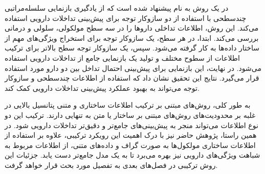 در \cite{ref_dai2020} یک روش به نام  پیشنهاد شده است که از یادگیری بازنمایی سلسله‌مراتبی چندسطحی با استفاده از دو سازوکار توجه برای پیش‌بینی تداخلات دارویی استفاده می‌کند. این روش، اطلاعات تداخلی داروها را در سه سطح مولکولی، سلولی و درمانی بررسی می‌کند. ابتدا، در هر سطح، یک سازوکار توجه برای استخراج ویژگی‌های مهم از ساختار داده‌ها به کار گرفته می‌شود. سپس، یک سازوکار توجه سطح بالاتر برای ترکیب اطلاعات از سطوح مختلف و تولید یک بازنمایی جامع از تداخلات دارویی استفاده می‌شود. در نهایت، این بازنمایی برای پیش‌بینی احتمال تداخل بین دو دارو مورد استفاده قرار می‌گیرد. نتایج این تحقیق نشان داد که استفاده از اطلاعات چندسطحی و سازوکار توجه می‌تواند به بهبود عملکرد پیش‌بینی تداخلات دارویی کمک کند.

به طور کلی، روش‌های مبتنی بر ترکیب اطلاعات ساختاری و متنی پتانسیل بالایی در غلبه بر محدودیت‌های روش‌های مبتنی بر ساختار یا متن به تنهایی دارند. ترکیب این دو نوع اطلاعات می‌تواند منجر به پیش‌بینی‌های جامع‌تر و دقیق‌تر تداخلات دارویی شود. در همین راستا، پژوهش حاضر نیز با درک اهمیت این رویکرد ترکیبی، علاوه بر استفاده از اطلاعات ساختاری مولکول‌ها به صورت گراف و داده‌های متنی، از اطلاعات مربوط به شباهت ویژگی‌های دارویی نیز بهره می‌برد تا به یک مدل جامع‌تر دست یابد. جزئیات این روش ترکیبی در فصل‌های بعدی به تفصیل مورد بحث قرار خواهد گرفت.

